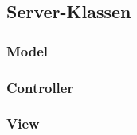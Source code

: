 \subsection{Server-Klassen}

\subsubsection{Model}

\subsubsection{Controller}

\subsubsection{View}
